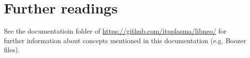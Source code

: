 \documentclass{article}
\begin{document}

\section{Further readings}\label{furtherreading}
See the documentatioin folder of \url{https://github.com/itpplasma/libneo/} for 
further information about concepts mentioned in this documentation (e.g. Boozer files).
\end{document}
